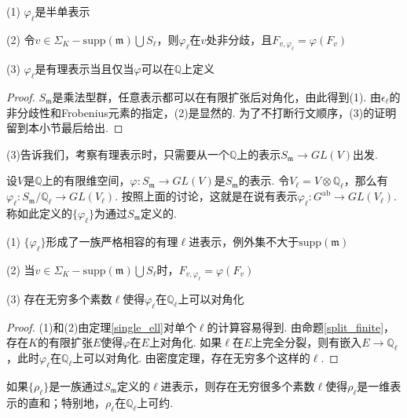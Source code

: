 \begin{cthm}
    (1) $\varphi_{\ell}$是半单表示

    (2) 令$v\in \Sigma_K - \mathrm{supp}(\mathfrak{m})\bigcup S_{\ell}$，则$\varphi_{\ell}$在$v$处非分歧，且$F_{v, \varphi_{\ell}} = \varphi(F_v)$

    (3) $\varphi_{\ell}$是有理表示当且仅当$\varphi$可以在$\mathbb{Q}$上定义 \label{single_ell}
\end{cthm}

\begin{proof}
    $S_{\mathfrak{m}}$是乘法型群，任意表示都可以在有限扩张后对角化，由此得到(1). 由$\epsilon_{\ell}$的非分歧性和Frobenius元素的指定，(2)是显然的.
    为了不打断行文顺序，(3)的证明留到本小节最后给出.
\end{proof}

(3)告诉我们，考察有理表示时，只需要从一个$\mathbb{Q}$上的表示$S_{\mathfrak{m}}\to GL(V)$出发.

设$V$是$\mathbb{Q}$上的有限维空间，$\varphi: S_{\mathfrak{m}}\to GL(V)$是$S_{\mathfrak{m}}$的表示. 令$V_{\ell} = V\otimes \mathbb{Q}_{\ell}$，那么有$\varphi_{\ell}: S_{\mathfrak{m}}/\mathbb{Q}_{\ell}\to GL(V_{\ell})$. 按照上面的讨论，这就是在说有表示$\varphi_{\ell}: G^{\mathrm{ab}}\to GL(V_{\ell})$. 称如此定义的$\{\varphi_{\ell}\}$为通过$S_{\mathfrak{m}}$定义的.

\begin{cthm}
    (1) $\{\varphi_{\ell}\}$形成了一族严格相容的有理$\ell$进表示，例外集不大于$\mathrm{supp}(\mathfrak{m})$

    (2) 当$v\in \Sigma_K - \mathrm{supp}(\mathfrak{m})\bigcup S_{\ell}$时，$F_{v, \varphi_{\ell}} = \varphi(F_v)$

    (3) 存在无穷多个素数$\ell$使得$\varphi_{\ell}$在$\mathbb{Q}_{\ell}$上可以对角化
\end{cthm}

\begin{proof}
    (1)和(2)由定理\ref{single_ell}对单个$\ell$的计算容易得到. 由命题\ref{split_finite}，存在$K$的有限扩张$E$使得$\varphi$在$E$上对角化. 如果$\ell$在$E$上完全分裂，则有嵌入$E\to \mathbb{Q}_{\ell}$，此时$\varphi_{\ell}$在$\mathbb{Q}_{\ell}$上可以对角化. 由\Chebotarev 密度定理，存在无穷多个这样的$\ell$.
\end{proof}

\begin{ccor}
    如果$\{\rho_{\ell}\}$是一族通过$S_{\mathfrak{m}}$定义的$\ell$进表示，则存在无穷很多个素数$\ell$使得$\rho_{\ell}$是一维表示的直和；特别地，$\rho_{\ell}$在$\mathbb{Q}_{\ell}$上可约.\label{sm_to_reducile}
\end{ccor}

